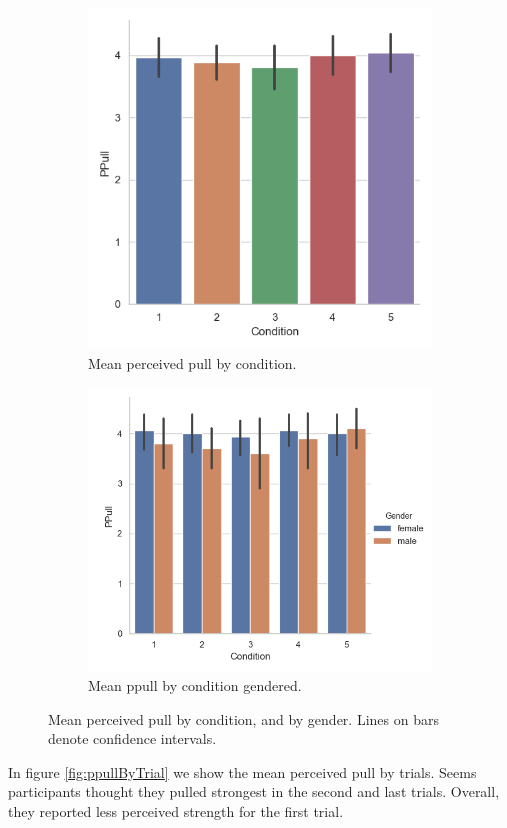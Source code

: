 \begin{figure}[H]
 \begin{subfigure}[b]{0.5\textwidth}
     \centering
     \includegraphics[scale=0.5]{Files/Plots/ppull_by_condition_mean.png}
     \caption{Mean perceived pull by condition.}
     \label{fig:meanPPullCond}
 \end{subfigure}
  \begin{subfigure}[b]{0.5\textwidth}
     \centering
     \includegraphics[scale=0.5]{Files/Plots/ppull_by_condition_median_gen.png}
     \caption{Mean ppull by condition gendered.}
     \label{fig:fig:meanPPullGenCond}
 \end{subfigure}
     \caption{Mean perceived pull by condition, and by gender. Lines on bars denote confidence intervals.}
    \label{fig:ppullByCond}
\end{figure}
In figure \ref{fig:ppullByTrial} we show the mean perceived pull by trials. Seems participants thought they pulled strongest in the second and last trials. Overall, they reported less perceived strength for the first trial.

